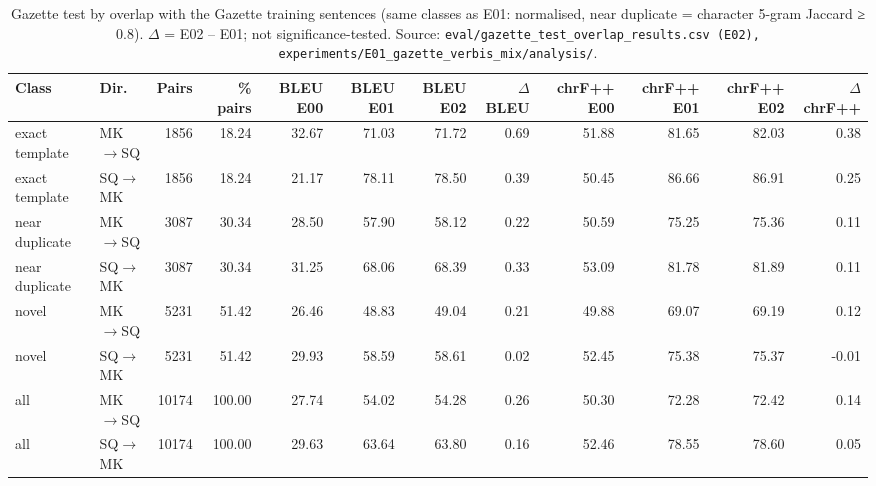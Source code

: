 \begin{table}[t]
\centering
\small
\begin{tabular}{llrrrrrrrrrr}
\toprule
Class & Dir. & Pairs & \% pairs & BLEU E00 & BLEU E01 & BLEU E02 & $\Delta$BLEU & chrF++ E00 & chrF++ E01 & chrF++ E02 & $\Delta$chrF++ \\
\midrule
exact template & MK$\rightarrow$SQ & 1856 & 18.24 & 32.67 & 71.03 & 71.72 & 0.69 & 51.88 & 81.65 & 82.03 & 0.38 \\
exact template & SQ$\rightarrow$MK & 1856 & 18.24 & 21.17 & 78.11 & 78.50 & 0.39 & 50.45 & 86.66 & 86.91 & 0.25 \\
near duplicate & MK$\rightarrow$SQ & 3087 & 30.34 & 28.50 & 57.90 & 58.12 & 0.22 & 50.59 & 75.25 & 75.36 & 0.11 \\
near duplicate & SQ$\rightarrow$MK & 3087 & 30.34 & 31.25 & 68.06 & 68.39 & 0.33 & 53.09 & 81.78 & 81.89 & 0.11 \\
novel & MK$\rightarrow$SQ & 5231 & 51.42 & 26.46 & 48.83 & 49.04 & 0.21 & 49.88 & 69.07 & 69.19 & 0.12 \\
novel & SQ$\rightarrow$MK & 5231 & 51.42 & 29.93 & 58.59 & 58.61 & 0.02 & 52.45 & 75.38 & 75.37 & -0.01 \\
all & MK$\rightarrow$SQ & 10174 & 100.00 & 27.74 & 54.02 & 54.28 & 0.26 & 50.30 & 72.28 & 72.42 & 0.14 \\
all & SQ$\rightarrow$MK & 10174 & 100.00 & 29.63 & 63.64 & 63.80 & 0.16 & 52.46 & 78.55 & 78.60 & 0.05 \\
\bottomrule
\end{tabular}
\caption{Gazette test by overlap with the Gazette training sentences (same classes as E01: normalised, near duplicate = character 5-gram Jaccard ≥ 0.8). $\Delta$ = E02 -- E01; not significance-tested. Source: \texttt{eval/gazette\_test\_overlap\_results.csv (E02), experiments/E01\_gazette\_verbis\_mix/analysis/}.}
\label{tab:e02-overlap}
\end{table}
